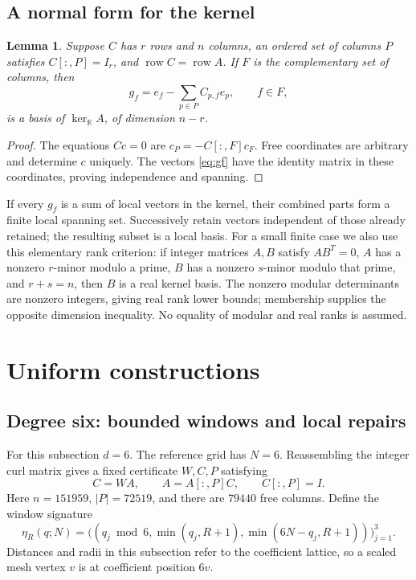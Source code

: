 \documentclass[11pt]{article}
\newtheorem{lemma}[theorem]{Lemma}
\theoremstyle{remark}
\DeclareMathOperator{\row}{row}
\newcommand{\R}{\mathbb R}
\begin{document}
\subsection{A normal form for the kernel}

\begin{lemma}\label{lem:normalform}
Suppose $C$ has $r$ rows and $n$ columns, an ordered set of columns $P$
satisfies $C[:,P]=I_r$, and $\row C=\row A$. If $F$ is the complementary
set of columns, then
\begin{equation}\label{eq:gf}
 g_f=e_f-\sum_{p\in P}C_{p,f}e_p,\qquad f\in F,
\end{equation}
is a basis of $\ker_\R A$, of dimension $n-r$.
\end{lemma}
\begin{proof}
The equations $Cc=0$ are $c_P=-C[:,F]c_F$. Free coordinates are arbitrary
and determine $c$ uniquely. The vectors \eqref{eq:gf} have the identity
matrix in these coordinates, proving independence and spanning.
\end{proof}

If every $g_f$ is a sum of local vectors in the kernel, their combined
parts form a finite local spanning set. Successively retain vectors
independent of those already retained; the resulting subset is a local
basis. For a small finite case we also use this elementary rank criterion:
if integer matrices $A,B$ satisfy $AB^T=0$, $A$ has a nonzero $r$-minor
modulo a prime, $B$ has a nonzero $s$-minor modulo that prime, and $r+s=n$,
then $B$ is a real kernel basis. The nonzero modular determinants are
nonzero integers, giving real rank lower bounds; membership supplies the
opposite dimension inequality. No equality of modular and real ranks is
assumed.

\section{Uniform constructions}\label{sec:uniform}

\subsection{Degree six: bounded windows and local repairs}

For this subsection $d=6$. The reference grid has $N=6$. Reassembling
the integer curl matrix gives a fixed certificate $W,C,P$ satisfying
\begin{equation}\label{eq:six-identities}
 C=WA,\qquad A=A[:,P]C,\qquad C[:,P]=I.
\end{equation}
Here $n=151959$, $|P|=72519$, and there are $79440$ free columns.
Define the window signature
\begin{equation}\label{eq:eta}
 \eta_R(q;N)=\big((q_j\bmod6,\min(q_j,R+1),
                              \min(6N-q_j,R+1))\big)_{j=1}^3.
\end{equation}
Distances and radii in this subsection refer to the coefficient lattice,
so a scaled mesh vertex $v$ is at coefficient position $6v$.
\end{document}
